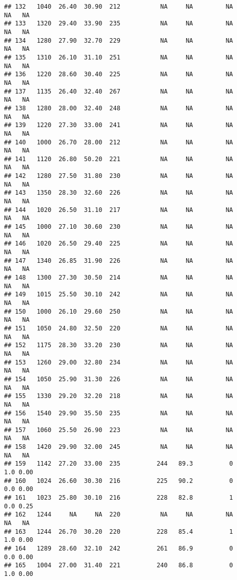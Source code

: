 \documentclass[
]{article}
\begin{document}
\begin{verbatim}
## 132   1040  26.40  30.90  212           NA     NA         NA      NA   NA
## 133   1320  29.40  33.90  235           NA     NA         NA      NA   NA
## 134   1280  27.90  32.70  229           NA     NA         NA      NA   NA
## 135   1310  26.10  31.10  251           NA     NA         NA      NA   NA
## 136   1220  28.60  30.40  225           NA     NA         NA      NA   NA
## 137   1135  26.40  32.40  267           NA     NA         NA      NA   NA
## 138   1280  28.00  32.40  248           NA     NA         NA      NA   NA
## 139   1220  27.30  33.00  241           NA     NA         NA      NA   NA
## 140   1000  26.70  28.00  212           NA     NA         NA      NA   NA
## 141   1120  26.80  50.20  221           NA     NA         NA      NA   NA
## 142   1280  27.50  31.80  230           NA     NA         NA      NA   NA
## 143   1350  28.30  32.60  226           NA     NA         NA      NA   NA
## 144   1020  26.50  31.10  217           NA     NA         NA      NA   NA
## 145   1000  27.10  30.60  230           NA     NA         NA      NA   NA
## 146   1020  26.50  29.40  225           NA     NA         NA      NA   NA
## 147   1340  26.85  31.90  226           NA     NA         NA      NA   NA
## 148   1300  27.30  30.50  214           NA     NA         NA      NA   NA
## 149   1015  25.50  30.10  242           NA     NA         NA      NA   NA
## 150   1000  26.10  29.60  250           NA     NA         NA      NA   NA
## 151   1050  24.80  32.50  220           NA     NA         NA      NA   NA
## 152   1175  28.30  33.20  230           NA     NA         NA      NA   NA
## 153   1260  29.00  32.80  234           NA     NA         NA      NA   NA
## 154   1050  25.90  31.30  226           NA     NA         NA      NA   NA
## 155   1330  29.20  32.20  218           NA     NA         NA      NA   NA
## 156   1540  29.90  35.50  235           NA     NA         NA      NA   NA
## 157   1060  25.50  26.90  223           NA     NA         NA      NA   NA
## 158   1420  29.90  32.00  245           NA     NA         NA      NA   NA
## 159   1142  27.20  33.00  235          244   89.3          0     1.0 0.00
## 160   1024  26.60  30.30  216          225   90.2          0     0.0 0.00
## 161   1023  25.80  30.10  216          228   82.8          1     0.0 0.25
## 162   1244     NA     NA  220           NA     NA         NA      NA   NA
## 163   1244  26.70  30.20  220          228   85.4          1     1.0 0.00
## 164   1289  28.60  32.10  242          261   86.9          0     0.0 0.00
## 165   1004  27.00  31.40  221          240   86.8          0     1.0 0.00

\end{verbatim}
\end{document}
